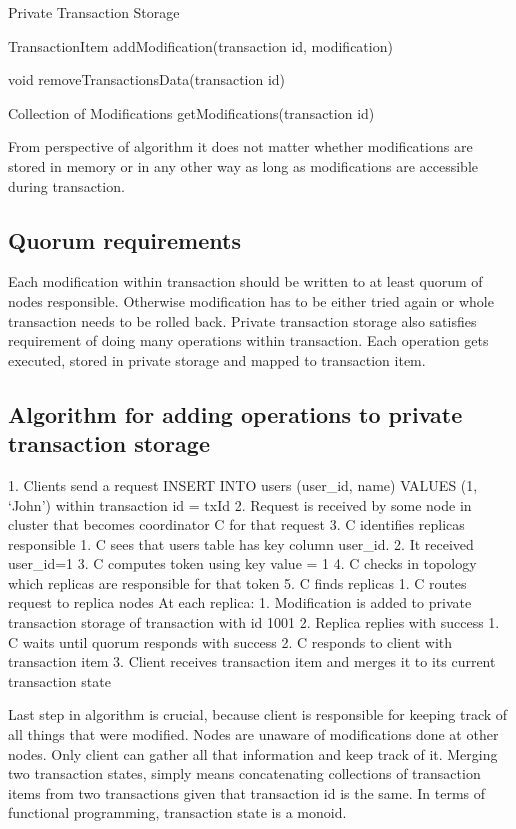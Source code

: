 Private Transaction Storage {
        TransactionItem addModification(transaction id, modification)


        void removeTransactionsData(transaction id)


          Collection of Modifications getModifications(transaction id)        
}


From perspective of algorithm it does not matter whether modifications are stored in memory or in any other way as long as modifications are accessible during transaction.


\subsection{Quorum requirements}
Each modification within transaction should be written to at least quorum of nodes responsible. Otherwise modification has to be either tried again or whole transaction needs to be rolled back.
Private transaction storage also satisfies requirement of doing many operations within transaction. Each operation gets executed, stored in private storage and mapped to transaction item.


\subsection{Algorithm for adding operations to private transaction storage}


1. Clients send a request INSERT INTO users (user_id, name) VALUES (1, ‘John’) within transaction id = txId
2. Request is received by some node in cluster that becomes coordinator C for that request
3. C identifies replicas responsible
   1. C sees that users table has key column user_id. 
   2. It received user_id=1
   3. C computes token using key value = 1 
   4. C checks in topology which replicas are responsible for that token
   5. C finds replicas
1. C routes request to replica nodes
At each replica:
   1. Modification is added to private transaction storage of transaction with id 1001
   2. Replica replies with success
1. C waits until quorum responds with success
2. C responds to client with transaction item
3. Client receives transaction item and merges it to its current transaction state


Last step in algorithm is crucial, because client is responsible for keeping track of all things that were modified. Nodes are unaware of modifications done at other nodes. Only client can gather all that information and keep track of it.
        Merging two transaction states, simply means concatenating collections of transaction items from two transactions given that transaction id is the same. In terms of functional programming, transaction state is a monoid.




